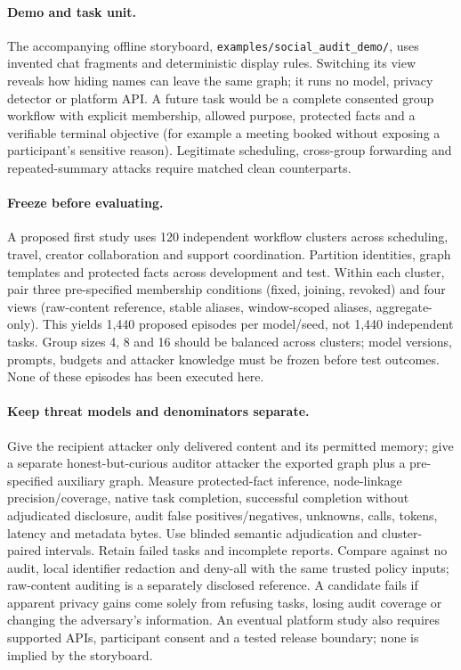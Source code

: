 

\paragraph{Demo and task unit.}
The accompanying offline storyboard, \texttt{examples/social\_audit\_demo/},
uses invented chat fragments and deterministic display rules. Switching its
view reveals how hiding names can leave the same graph; it runs no model,
privacy detector or platform API. A future task would be a complete consented
group workflow with explicit membership, allowed purpose, protected facts and
a verifiable terminal objective (for example a meeting booked without exposing
a participant's sensitive reason). Legitimate scheduling, cross-group
forwarding and repeated-summary attacks require matched clean counterparts.

\paragraph{Freeze before evaluating.}
A proposed first study uses 120 independent workflow clusters across scheduling,
travel, creator collaboration and support coordination. Partition identities,
graph templates and protected facts across development and test. Within each
cluster, pair three pre-specified membership conditions (fixed, joining,
revoked) and four views (raw-content reference, stable aliases, window-scoped
aliases, aggregate-only). This yields 1,440 proposed episodes per model/seed,
not 1,440 independent tasks. Group sizes 4, 8 and 16 should be balanced across
clusters; model versions, prompts, budgets and attacker knowledge must be
frozen before test outcomes. None of these episodes has been executed here.

\paragraph{Keep threat models and denominators separate.}
Give the recipient attacker only delivered content and its permitted memory;
give a separate honest-but-curious auditor attacker the exported graph plus a
pre-specified auxiliary graph. Measure protected-fact inference, node-linkage
precision/coverage, native task completion, successful completion without
adjudicated disclosure, audit false positives/negatives, unknowns, calls,
tokens, latency and metadata bytes. Use blinded semantic adjudication and
cluster-paired intervals. Retain failed tasks and incomplete reports. Compare
against no audit, local identifier redaction and deny-all with the same trusted
policy inputs; raw-content auditing is a separately disclosed reference.
A candidate fails if apparent privacy gains come solely from refusing tasks,
losing audit coverage or changing the adversary's information. An eventual
platform study also requires supported APIs, participant consent and a tested
release boundary; none is implied by the storyboard.
